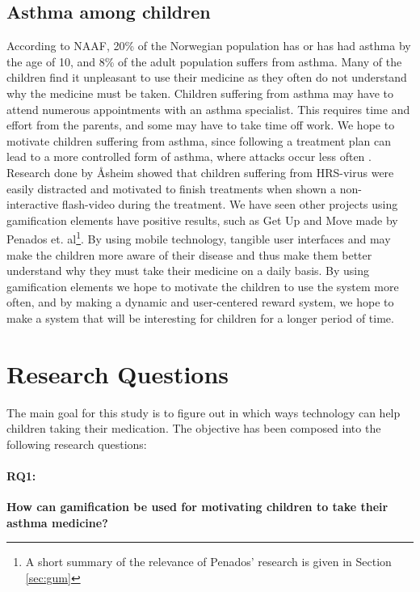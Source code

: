 \subsection{Asthma among children}
According to NAAF, 20\% of the Norwegian population has or has had asthma by the age of 10, and 8\% of the adult population suffers from asthma\cite{NAAF}. Many of the children find it unpleasant to use their medicine as they often do not understand why the medicine must be taken. Children suffering from asthma may have to attend numerous appointments with an asthma specialist. This requires time and effort from the parents, and some may have to take time off work. 
We hope to motivate children suffering from asthma, since following a treatment plan can lead to a more controlled form of asthma, where attacks occur less often \cite{ginasthma}. 
Research done by \r{A}sheim showed that children suffering from HRS-virus were easily distracted and motivated to finish treatments when shown a non-interactive flash-video during the treatment\cite{Asheim610877}. We have seen other projects using gamification elements have positive results, such as Get Up and Move made by Penados et. al\cite{penadosget}\footnote{A short summary of the relevance of Penados' research is given in Section \ref{sec:gum}}. 
By using mobile technology, tangible user interfaces and may make the children more aware of their disease and thus make them better understand why they must take their medicine on a daily basis. 
By using gamification elements we hope to motivate the children to use the system more often, and by making a dynamic and user-centered reward system, we hope to make a system that will be interesting for children for a longer period of time.  


\section{Research Questions}
\label{sec:researchquestions}
The main goal for this study is to figure out in which ways technology can help children taking their medication. The objective has been composed into the following research questions: 

\paragraph{RQ1:}
\textbf{How can gamification be used for motivating children to take their asthma medicine?}


